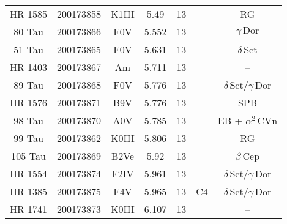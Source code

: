 \begin{table*}
\begin{tabular}{ccccccc}
HR 1585 & 200173858 & K1III & 5.49 & 13 &  & RG \\
80 Tau & 200173866 & F0V & 5.552 & 13 &  & $\gamma\,\text{Dor}$ \\
51 Tau & 200173865 & F0V & 5.631 & 13 &  & $\delta\,\text{Sct}$ \\
HR 1403 & 200173867 & Am & 5.711 & 13 &  & -- \\
89 Tau & 200173868 & F0V & 5.776 & 13 &  & $\delta\,\text{Sct}$/$\gamma\,\text{Dor}$ \\
HR 1576 & 200173871 & B9V & 5.776 & 13 &  & SPB \\
98 Tau & 200173870 & A0V & 5.785 & 13 &  & EB + $\alpha^2\,\text{CVn}$ \\
99 Tau & 200173862 & K0III & 5.806 & 13 &  & RG \\
105 Tau & 200173869 & B2Ve & 5.92 & 13 &  & $\beta$\,Cep \\
HR 1554 & 200173874 & F2IV & 5.961 & 13 &  & $\delta\,\text{Sct}$/$\gamma\,\text{Dor}$ \\
HR 1385 & 200173875 & F4V & 5.965 & 13 & C4 & $\delta\,\text{Sct}$/$\gamma\,\text{Dor}$ \\
HR 1741 & 200173873 & K0III & 6.107 & 13 &  & -- \\
\hline
\end{tabular}
\end{table*}
